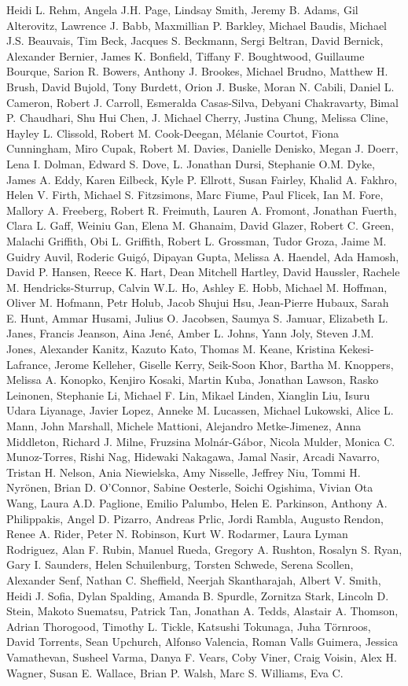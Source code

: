 \begin{thebibliography}{9}
Heidi L. Rehm, Angela J.H. Page, Lindsay Smith, Jeremy B. Adams, Gil Alterovitz, Lawrence J. Babb, Maxmillian P. Barkley, Michael Baudis, Michael J.S. Beauvais, Tim Beck, Jacques S. Beckmann, Sergi Beltran, David Bernick, Alexander Bernier, James K. Bonfield, Tiffany F. Boughtwood, Guillaume Bourque, Sarion R. Bowers, Anthony J. Brookes, Michael Brudno, Matthew H. Brush, David Bujold, Tony Burdett, Orion J. Buske, Moran N. Cabili, Daniel L. Cameron, Robert J. Carroll, Esmeralda Casas-Silva, Debyani Chakravarty, Bimal P. Chaudhari, Shu Hui Chen, J. Michael Cherry, Justina Chung, Melissa Cline, Hayley L. Clissold, Robert M. Cook-Deegan, Mélanie Courtot, Fiona Cunningham, Miro Cupak, Robert M. Davies, Danielle Denisko, Megan J. Doerr, Lena I. Dolman, Edward S. Dove, L. Jonathan Dursi, Stephanie O.M. Dyke, James A. Eddy, Karen Eilbeck, Kyle P. Ellrott, Susan Fairley, Khalid A. Fakhro, Helen V. Firth, Michael S. Fitzsimons, Marc Fiume, Paul Flicek, Ian M. Fore, Mallory A. Freeberg, Robert R. Freimuth, Lauren A. Fromont, Jonathan Fuerth, Clara L. Gaff, Weiniu Gan, Elena M. Ghanaim, David Glazer, Robert C. Green, Malachi Griffith, Obi L. Griffith, Robert L. Grossman, Tudor Groza, Jaime M. Guidry Auvil, Roderic Guigó, Dipayan Gupta, Melissa A. Haendel, Ada Hamosh, David P. Hansen, Reece K. Hart, Dean Mitchell Hartley, David Haussler, Rachele M. Hendricks-Sturrup, Calvin W.L. Ho, Ashley E. Hobb, Michael M. Hoffman, Oliver M. Hofmann, Petr Holub, Jacob Shujui Hsu, Jean-Pierre Hubaux, Sarah E. Hunt, Ammar Husami, Julius O. Jacobsen, Saumya S. Jamuar, Elizabeth L. Janes, Francis Jeanson, Aina Jené, Amber L. Johns, Yann Joly, Steven J.M. Jones, Alexander Kanitz, Kazuto Kato, Thomas M. Keane, Kristina Kekesi-Lafrance, Jerome Kelleher, Giselle Kerry, Seik-Soon Khor, Bartha M. Knoppers, Melissa A. Konopko, Kenjiro Kosaki, Martin Kuba, Jonathan Lawson, Rasko Leinonen, Stephanie Li, Michael F. Lin, Mikael Linden, Xianglin Liu, Isuru Udara Liyanage, Javier Lopez, Anneke M. Lucassen, Michael Lukowski, Alice L. Mann, John Marshall, Michele Mattioni, Alejandro Metke-Jimenez, Anna Middleton, Richard J. Milne, Fruzsina Molnár-Gábor, Nicola Mulder, Monica C. Munoz-Torres, Rishi Nag, Hidewaki Nakagawa, Jamal Nasir, Arcadi Navarro, Tristan H. Nelson, Ania Niewielska, Amy Nisselle, Jeffrey Niu, Tommi H. Nyrönen, Brian D. O'Connor, Sabine Oesterle, Soichi Ogishima, Vivian Ota Wang, Laura A.D. Paglione, Emilio Palumbo, Helen E. Parkinson, Anthony A. Philippakis, Angel D. Pizarro, Andreas Prlic, Jordi Rambla, Augusto Rendon, Renee A. Rider, Peter N. Robinson, Kurt W. Rodarmer, Laura Lyman Rodriguez, Alan F. Rubin, Manuel Rueda, Gregory A. Rushton, Rosalyn S. Ryan, Gary I. Saunders, Helen Schuilenburg, Torsten Schwede, Serena Scollen, Alexander Senf, Nathan C. Sheffield, Neerjah Skantharajah, Albert V. Smith, Heidi J. Sofia, Dylan Spalding, Amanda B. Spurdle, Zornitza Stark, Lincoln D. Stein, Makoto Suematsu, Patrick Tan, Jonathan A. Tedds, Alastair A. Thomson, Adrian Thorogood, Timothy L. Tickle, Katsushi Tokunaga, Juha Törnroos, David Torrents, Sean Upchurch, Alfonso Valencia, Roman Valls Guimera, Jessica Vamathevan, Susheel Varma, Danya F. Vears, Coby Viner, Craig Voisin, Alex H. Wagner, Susan E. Wallace, Brian P. Walsh, Marc S. Williams, Eva C. 
\end{thebibliography}
